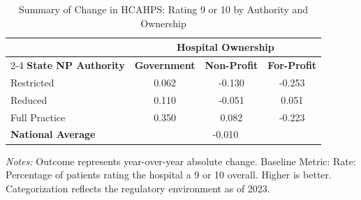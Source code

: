 \begin{table}[htbp]
    \centering
    \caption{Summary of Change in HCAHPS: Rating 9 or 10 by Authority and Ownership}
    \label{tab:d_h_hosp_rating_9_10_own}
    \vspace{0.2cm}
    \begin{tabular}{lccc}
        \toprule
        & \multicolumn{3}{c}{\textbf{Hospital Ownership}} \\
        \cmidrule(lr){2-4}
        \textbf{State NP Authority} & \textbf{Government} & \textbf{Non-Profit} & \textbf{For-Profit} \\
        \midrule
        Restricted & 0.062 & -0.130 & -0.253 \\
        Reduced & 0.110 & -0.051 & 0.051 \\
        Full Practice & 0.350 & 0.082 & -0.223 \\
        \midrule
        \textbf{National Average} & \multicolumn{3}{c}{-0.010} \\
        \bottomrule
    \end{tabular}
    \vspace{0.1cm}
    \begin{minipage}{0.85\textwidth}
        \footnotesize \textit{Notes:} Outcome represents year-over-year absolute change. Baseline Metric: Rate: Percentage of patients rating the hospital a 9 or 10 overall. Higher is better. Categorization reflects the regulatory environment as of 2023.
    \end{minipage}
\end{table}